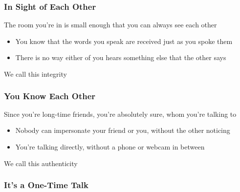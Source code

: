 \documentclass[aspectratio=169]{beamer}
\begin{document}
\begin{frame}
	\frametitle{In Sight of Each Other}
	The room you're in is small enough that you can always see each other
	\begin{itemize}
		\item You know that the words you speak are received just as you spoke them
		\item There is no way either of you hears something else that the other says
	\end{itemize}
	We call this \alert{integrity}
\end{frame}

\begin{frame}
	\frametitle{You Know Each Other}
	Since you're long-time friends, you're absolutely sure, whom you're talking to
	\begin{itemize}
		\item Nobody can impersonate your friend or you, without the other noticing
		\item You're talking directly, without a phone or webcam in between
	\end{itemize}
	We call this \alert{authenticity}
\end{frame}

\begin{frame}
	\frametitle{It's a One-Time Talk}
\end{frame}
\end{document}
